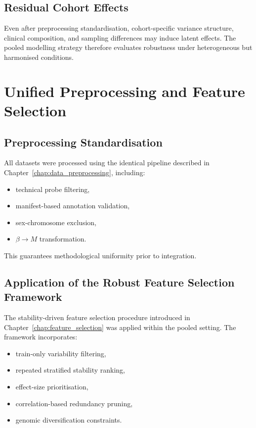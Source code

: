 \subsection{Residual Cohort Effects}

Even after preprocessing standardisation,
cohort-specific variance structure,
clinical composition,
and sampling differences may induce latent effects.
The pooled modelling strategy therefore evaluates robustness
under heterogeneous but harmonised conditions.

\section{Unified Preprocessing and Feature Selection}

\subsection{Preprocessing Standardisation}

All datasets were processed using the identical pipeline
described in Chapter~\ref{chap:data_preprocessing},
including:

\begin{itemize}
\item technical probe filtering,
\item manifest-based annotation validation,
\item sex-chromosome exclusion,
\item $\beta \rightarrow M$ transformation.
\end{itemize}

This guarantees methodological uniformity prior to integration.

\subsection{Application of the Robust Feature Selection Framework}

The stability-driven feature selection procedure
introduced in Chapter~\ref{chap:feature_selection}
was applied within the pooled setting.
The framework incorporates:

\begin{itemize}
\item train-only variability filtering,
\item repeated stratified stability ranking,
\item effect-size prioritisation,
\item correlation-based redundancy pruning,
\item genomic diversification constraints.
\end{itemize}


